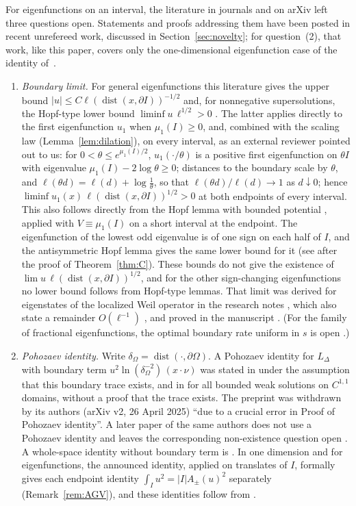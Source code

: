 \documentclass[11pt]{amsart}
\newcommand{\LD}{L_\Delta}
\DeclareMathOperator{\dist}{dist}
\theoremstyle{definition}
\theoremstyle{remark}
\numberwithin{equation}{section}
\begin{document}
For eigenfunctions on an interval, the literature in journals and on arXiv left three questions open. Statements and proofs addressing them have been posted in recent unrefereed work, discussed in Section~\ref{sec:novelty}; for question~(2), that work, like this paper, covers only the one-dimensional eigenfunction case of the identity of~\cite{AGV24}.
\begin{enumerate}
\item \emph{Boundary limit.} For general eigenfunctions this literature gives the upper bound $|u|\le C\ell(\dist(x,\partial I))^{-1/2}$ \cite[Thm.~1.1]{HLS25} and, for nonnegative supersolutions, the Hopf-type lower bound $\liminf u\,\ell^{1/2}>0$ \cite[Thm.~1.4]{HLS25}. The latter applies directly to the first eigenfunction $u_1$ when $\mu_1(I)\ge0$, and, combined with the scaling law (Lemma~\ref{lem:dilation}), on every interval, as an external reviewer pointed out to us: for $0<\theta\le e^{\mu_1(I)/2}$, $u_1(\cdot/\theta)$ is a positive first eigenfunction on $\theta I$ with eigenvalue $\mu_1(I)-2\log\theta\ge0$; distances to the boundary scale by $\theta$, and $\ell(\theta d)=\ell(d)+\log\frac1\theta$, so that $\ell(\theta d)/\ell(d)\to1$ as $d\downarrow0$; hence $\liminf u_1(x)\,\ell(\dist(x,\partial I))^{1/2}>0$ at both endpoints of every interval. This also follows directly from the Hopf lemma with bounded potential \cite[Lemma~3.11]{PS25}, applied with $V\equiv\mu_1(I)$ on a short interval at the endpoint. The eigenfunction of the lowest odd eigenvalue is of one sign on each half of $I$, and the antisymmetric Hopf lemma \cite[Lemma~3.4]{PS25} gives the same lower bound for it (see after the proof of Theorem~\ref{thm:C}). These bounds do not give the existence of $\lim u\,\ell(\dist(x,\partial I))^{1/2}$, and for the other sign-changing eigenfunctions no lower bound follows from Hopf-type lemmas. That limit was derived for eigenstates of the localized Weil operator in the research notes \cite[PL-319--PL-323]{Mathia26}, which also state a remainder $O(\ell^{-1})$ \cite[PL-329, PL-336, PL-337]{Mathia26}, and proved in the manuscript \cite[\S3.3]{BT26}. (For the family of fractional eigenfunctions, the optimal boundary rate uniform in $s$ is open \cite[Rem.~1.2(iii)]{FJW22}.)
\item \emph{Pohozaev identity.} Write $\delta_\Omega=\dist(\cdot,\partial\Omega)$. A Pohozaev identity for $\LD$ with boundary term $u^2\ln(\delta_\Omega^{-2})\,(x\cdot\nu)$ was stated in \cite[Thm.~2.3]{AGV24} under the assumption that this boundary trace exists, and in \cite[Cor.~3.8]{AGV24} for all bounded weak solutions on $C^{1,1}$ domains, without a proof that the trace exists. The preprint was withdrawn by its authors (arXiv v2, 26 April 2025) ``due to a crucial error in Proof of Pohozaev identity''. A later paper of the same authors does not use a Pohozaev identity and leaves the corresponding non-existence question open \cite[\S6]{AGV25}. A whole-space identity without boundary term is \cite[Prop.~6.1]{CZ25}. In one dimension and for eigenfunctions, the announced identity, applied on translates of $I$, formally gives each endpoint identity $\int_Iu^2=|I|A_\pm(u)^2$ separately (Remark~\ref{rem:AGV}), and these identities follow from \cite[Cor.~2.3]{BT26}.

\end{enumerate}
\end{document}
